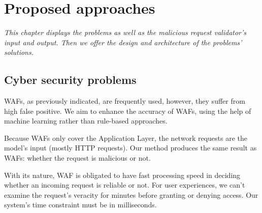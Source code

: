 \chapter{Proposed approaches}
\label{chap:proposed_approaches}
	\textit{\hspace{0.5cm}This chapter displays the problems as well as the malicious request validator's input and output. Then we offer the design and architecture of the problems' solutions.}
\minitoc
 
\section{Cyber security problems}
\label{Cyber problems}
\hspace{0.5cm}WAFs, as previously indicated, are frequently used, however, they suffer from high false positive. We aim to enhance the accuracy of WAFs, using the help of machine learning rather than rule-based approaches.  

Because WAFs only cover the Application Layer, the network requests are the model's input (mostly HTTP requests). Our method produces the same result as WAFs: whether the request is malicious or not.

With its nature, WAF is obligated to have fast processing speed in deciding whether an incoming request is reliable or not. For user experiences, we can't examine the request's veracity for minutes before granting or denying access. Our system's time constraint must be in milliseconds.

